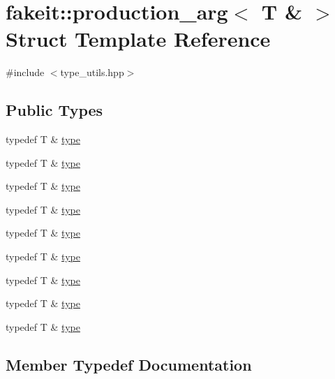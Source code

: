 \hypertarget{structfakeit_1_1production__arg_3_01T_01_6_01_4}{}\section{fakeit\+::production\+\_\+arg$<$ T \& $>$ Struct Template Reference}
\label{structfakeit_1_1production__arg_3_01T_01_6_01_4}


{\ttfamily \#include $<$type\+\_\+utils.\+hpp$>$}

\subsection*{Public Types}
\begin{DoxyCompactItemize}
\item 
typedef T \& \mbox{\hyperlink{structfakeit_1_1production__arg_3_01T_01_6_01_4_ad35caaa171d7adc8381ef40fcf37bd22}{type}}
\item 
typedef T \& \mbox{\hyperlink{structfakeit_1_1production__arg_3_01T_01_6_01_4_ad35caaa171d7adc8381ef40fcf37bd22}{type}}
\item 
typedef T \& \mbox{\hyperlink{structfakeit_1_1production__arg_3_01T_01_6_01_4_ad35caaa171d7adc8381ef40fcf37bd22}{type}}
\item 
typedef T \& \mbox{\hyperlink{structfakeit_1_1production__arg_3_01T_01_6_01_4_ad35caaa171d7adc8381ef40fcf37bd22}{type}}
\item 
typedef T \& \mbox{\hyperlink{structfakeit_1_1production__arg_3_01T_01_6_01_4_ad35caaa171d7adc8381ef40fcf37bd22}{type}}
\item 
typedef T \& \mbox{\hyperlink{structfakeit_1_1production__arg_3_01T_01_6_01_4_ad35caaa171d7adc8381ef40fcf37bd22}{type}}
\item 
typedef T \& \mbox{\hyperlink{structfakeit_1_1production__arg_3_01T_01_6_01_4_ad35caaa171d7adc8381ef40fcf37bd22}{type}}
\item 
typedef T \& \mbox{\hyperlink{structfakeit_1_1production__arg_3_01T_01_6_01_4_ad35caaa171d7adc8381ef40fcf37bd22}{type}}
\item 
typedef T \& \mbox{\hyperlink{structfakeit_1_1production__arg_3_01T_01_6_01_4_ad35caaa171d7adc8381ef40fcf37bd22}{type}}
\end{DoxyCompactItemize}


\subsection{Member Typedef Documentation}
\mbox{\label{structfakeit_1_1production__arg_3_01T_01_6_01_4_ad35caaa171d7adc8381ef40fcf37bd22}} 

